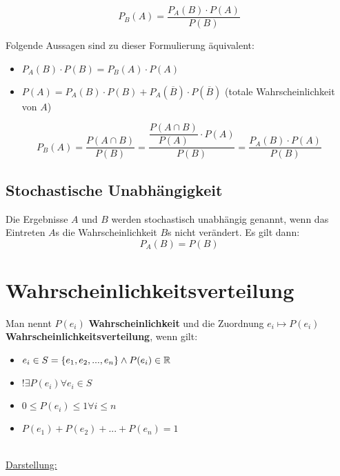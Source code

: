\documentclass[main.tex]{subfiles}
\begin{document}
\begin{Theorem}
  $$P_B(A)=\dfrac{P_A(B)\cdot P(A)}{P(B)}$$
\end{Theorem}
\begin{Bemerkung}
  Folgende Aussagen sind zu dieser Formulierung äquivalent:
  \begin{itemize}
    \item $P_A(B)\cdot P(B) = P_B(A)\cdot P(A)$
    \item $P(A) = P_A(B) \cdot P(B) + P_A(\overline B) \cdot P(\overline B)$ (totale Wahrscheinlichkeit von $A$)
  \end{itemize}
\end{Bemerkung}
\begin{Beweis}
  $$P_B(A) = \dfrac{P(A\cap B)}{P(B)} = \dfrac{\dfrac{P(A\cap B)}{P(A)}\cdot P(A)}{P(B)} = \dfrac{P_A(B)\cdot P(A)}{P(B)}$$
\end{Beweis}
\subsection{Stochastische Unabhängigkeit}
\begin{Definition}
  Die Ergebnisse $A$ und $B$ werden stochastisch unabhängig genannt, wenn das Eintreten $A$s die Wahrscheinlichkeit $B$s nicht verändert. Es gilt dann:
  $$P_A(B)=P(B)$$
\end{Definition}



\section{Wahrscheinlichkeitsverteilung}
\begin{Definition}
  Man nennt $P(e_i)$ \textbf{Wahrscheinlichkeit} und die Zuordnung $e_i \longmapsto P(e_i)$ \textbf{Wahrscheinlichkeitsverteilung}, wenn gilt:
  \begin{itemize}
    \item $e_i \in S=\{ e_1,e_2,...,e_n\} \land P(e_i)\in \mathbb{R}$
    \item $!\exists P(e_i) \forall e_i \in S$
    \item $0 \leq P(e_i)\leq 1 \forall i \leq n$
    \item $P(e_1)+P(e_2)+...+P(e_n)=1$
  \end{itemize}
\end{Definition}\\
\underline{Darstellung:}\\
\end{document}

